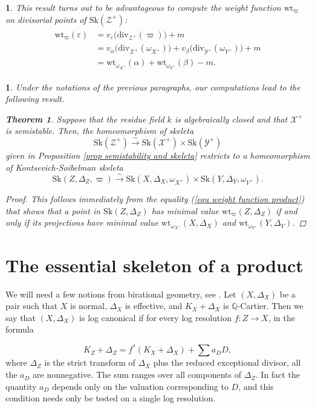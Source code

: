 \documentclass{amsart}%
\numberwithin{equation}{subsection}
\theoremstyle{plain2}
\newtheorem{thm}[equation]{Theorem}
\theoremstyle{definition2}
\theoremstyle{stepstyle}
\theoremstyle{point}
\theoremstyle{subpoint}
\newtheorem{subpoint}[equation]{}%
\newcommand{\spa}[1]{\begin{subpoint}#1\end{subpoint}}           %
\newcommand{\cX}{\ensuremath{\mathscr{X}}}
\newcommand{\cY}{\ensuremath{\mathscr{Y}}}
\newcommand{\cZ}{\ensuremath{\mathscr{Z}}}
\renewcommand{\cZ}{\ensuremath{\mathscr{Z}}}
\renewcommand{\cY}{\ensuremath{\mathscr{Y}}}
\newcommand{\divisor}{\mathrm{div}}
\newcommand{\weight}{\mathrm{wt}}
\newcommand{\Sk}{\mathrm{Sk}}
\begin{document}
\spa{This result turns out to be advantageous to compute the weight function $\weight_\varpi$ on divisorial points of $\Sk(\cZ^+)$: 
\begin{align} \label{equ weight function product}
\begin{split}
\weight_\varpi(\varepsilon)
& = v_{\varepsilon}\big(\divisor_{\cZ^+}(\varpi)\big) +m \\
& = v_{\alpha}\big(\divisor_{\cX^+}(\omega_{X^+})\big) + v_{\beta}\big(\divisor_{\cY^+}(\omega_{Y^+})\big) + m \\
& = \weight_{\omega_{X^+}}(\alpha) + \weight_{\omega_{Y^+}}(\beta) - m.
\end{split}
\end{align}
}


\spa{Under the notations of the previous paragraphs, our computations lead to the following result.
\begin{thm}  \label{thm semistability and KS skeleta}
Suppose that the residue field $k$ is algebraically closed and that $\cX^+$ is semistable. Then, the homeomorphism of skeleta $$\Sk(\cZ^+) \xrightarrow{\sim} \Sk(\cX^+) \times \Sk(\cY^+)$$ given in Proposition \ref{prop semistability and skeleta} restricts to a homeomorphism of Kontsevich-Soibelman skeleta $$\Sk(Z,\Delta_Z, \varpi) \xrightarrow{\sim} \Sk(X,\Delta_X, \omega_{X^+}) \times \Sk(Y,\Delta_Y, \omega_{Y^+}).$$ 
\end{thm}
\begin{proof}
This follows immediately from the equality (\ref{equ weight function product}) that shows that a point in $\Sk(Z,\Delta_Z)$ has minimal value $\weight_{\varpi}(Z,\Delta_Z)$ if and only if its projections have minimal value $\weight_{\omega_{X^+}}(X,\Delta_X)$ and $\weight_{\omega_{Y^+}}(Y,\Delta_Y)$.
\end{proof}
}

\section{The essential skeleton of a product}
We will need a few notions from birational geometry, see \cite{KollarMori}. Let $(X,\Delta_X)$ be a pair such that $X$ is normal, $\Delta_X$ is effective, and $K_X+\Delta_X$ is $\mathbb{Q}$-Cartier. Then we say that $(X,\Delta_X)$ is log canonical if for every log resolution $f \colon Z \to X$, in the formula

\[
K_Z+\Delta_Z = f^*(K_X+\Delta_X)+\sum a_D D,
\]
where $\Delta_Z$ is the strict transform of $\Delta_X$ plus the reduced exceptional divisor, all the $a_D$ are nonnegative. The sum ranges over all components of $\Delta_Z$. In fact the quantity $a_D$ depends only on the valuation corresponding to $D$, and this condition needs only be tested on a single log resolution.
\end{document}
